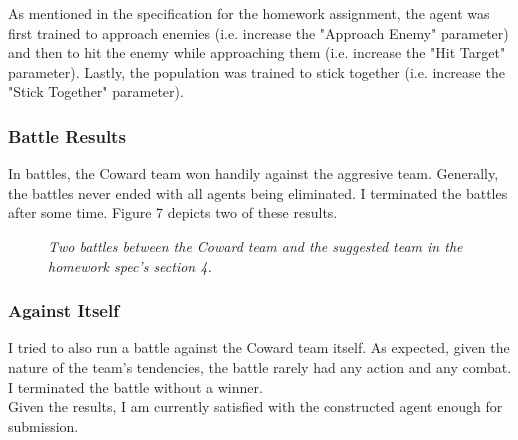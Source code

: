 \documentclass{article} %
\begin{document}
As mentioned in the specification for the homework assignment, the agent was first trained to approach enemies (i.e. increase the "Approach Enemy" parameter) and then to hit the enemy while approaching them (i.e. increase the "Hit Target" parameter). Lastly, the population was trained to stick together (i.e. increase the "Stick Together" parameter).

\subsubsection{Battle Results}

In battles, the Coward team won handily against the aggresive team. Generally, the battles never ended with all agents being eliminated. I terminated the battles after some time. Figure 7 depicts two of these results. 

\begin{figure}[H]%
	\centering
    	\hfill%
    	\hfill%
    \caption{\textit{Two battles between the Coward team and the suggested team in the homework spec's section 4.}}
    \label{fig:default}
\end{figure} 

\subsubsection{Against Itself}
I tried to also run a battle against the Coward team itself. As expected, given the nature of the team's tendencies, the battle rarely had any action and any combat. I terminated the battle without a winner.
\\[1\baselineskip]
Given the results, I am currently satisfied with the constructed agent enough for submission. 
\end{document}
